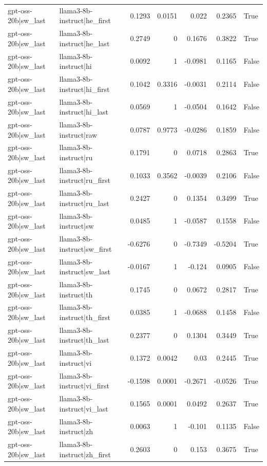 \begin{table}
\begin{tabular}{l l r r r r l}
gpt-oss-20b|sw_last & llama3-8b-instruct|he_first & 0.1293 & 0.0151 & 0.022 & 0.2365 & True \\
gpt-oss-20b|sw_last & llama3-8b-instruct|he_last & 0.2749 & 0 & 0.1676 & 0.3822 & True \\
gpt-oss-20b|sw_last & llama3-8b-instruct|hi & 0.0092 & 1 & -0.0981 & 0.1165 & False \\
gpt-oss-20b|sw_last & llama3-8b-instruct|hi_first & 0.1042 & 0.3316 & -0.0031 & 0.2114 & False \\
gpt-oss-20b|sw_last & llama3-8b-instruct|hi_last & 0.0569 & 1 & -0.0504 & 0.1642 & False \\
gpt-oss-20b|sw_last & llama3-8b-instruct|raw & 0.0787 & 0.9773 & -0.0286 & 0.1859 & False \\
gpt-oss-20b|sw_last & llama3-8b-instruct|ru & 0.1791 & 0 & 0.0718 & 0.2863 & True \\
gpt-oss-20b|sw_last & llama3-8b-instruct|ru_first & 0.1033 & 0.3562 & -0.0039 & 0.2106 & False \\
gpt-oss-20b|sw_last & llama3-8b-instruct|ru_last & 0.2427 & 0 & 0.1354 & 0.3499 & True \\
gpt-oss-20b|sw_last & llama3-8b-instruct|sw & 0.0485 & 1 & -0.0587 & 0.1558 & False \\
gpt-oss-20b|sw_last & llama3-8b-instruct|sw_first & -0.6276 & 0 & -0.7349 & -0.5204 & True \\
gpt-oss-20b|sw_last & llama3-8b-instruct|sw_last & -0.0167 & 1 & -0.124 & 0.0905 & False \\
gpt-oss-20b|sw_last & llama3-8b-instruct|th & 0.1745 & 0 & 0.0672 & 0.2817 & True \\
gpt-oss-20b|sw_last & llama3-8b-instruct|th_first & 0.0385 & 1 & -0.0688 & 0.1458 & False \\
gpt-oss-20b|sw_last & llama3-8b-instruct|th_last & 0.2377 & 0 & 0.1304 & 0.3449 & True \\
gpt-oss-20b|sw_last & llama3-8b-instruct|vi & 0.1372 & 0.0042 & 0.03 & 0.2445 & True \\
gpt-oss-20b|sw_last & llama3-8b-instruct|vi_first & -0.1598 & 0.0001 & -0.2671 & -0.0526 & True \\
gpt-oss-20b|sw_last & llama3-8b-instruct|vi_last & 0.1565 & 0.0001 & 0.0492 & 0.2637 & True \\
gpt-oss-20b|sw_last & llama3-8b-instruct|zh & 0.0063 & 1 & -0.101 & 0.1135 & False \\
gpt-oss-20b|sw_last & llama3-8b-instruct|zh_first & 0.2603 & 0 & 0.153 & 0.3675 & True \\

\end{tabular}
\end{table}
